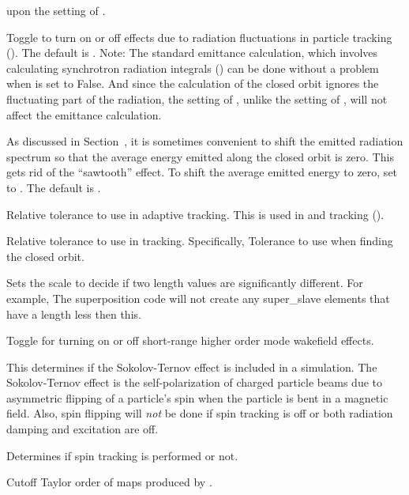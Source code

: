 {\begin{description}
upon the setting of .
%
\item[\vn{radiation_fluctuations_on}] \Newline
Toggle to turn on or off effects due to radiation fluctuations in particle tracking
().  The default is . Note: The standard \bmad emittance calculation,
which involves calculating synchrotron radiation integrals () can be done without
a problem when  is set to False. And since the calculation of the closed orbit
ignores the fluctuating part of the radiation, the setting of , unlike the
setting of , will not affect the emittance calculation.
%
\item[\vn{radiation_zero_average}] \Newline
As discussed in Section~, it is sometimes convenient to shift the emitted radiation
spectrum so that the average energy emitted along the closed orbit is zero. This gets rid of the ``sawtooth''
effect. To shift the average emitted energy to zero, set  to . The
default is .
%
\item[\vn{rel_tol_adaptive_tracking}] \Newline
Relative tolerance to use in adaptive tracking. This is used in  and
 tracking ().
%
\item[\vn{rel_tol_tracking}] \Newline
Relative tolerance to use in tracking. Specifically, Tolerance to use when finding the closed orbit.
%
\item[\vn{significant_length}] \Newline
Sets the scale to decide if two length values are significantly different. For example, The
superposition code will not create any super_slave elements that have a length less then this.
%
\item[\vn{sr_wakes_on}] \Newline
Toggle for turning on or off short-range higher order mode wakefield effects.
%
\item[\vn{spin_sokolov_ternov_flipping_on}] \Newline
This determines if the Sokolov-Ternov effect is included in a simulation.  The Sokolov-Ternov
effect\cite{b:barber99} is the self-polarization of charged particle beams due to asymmetric flipping
of a particle's spin when the particle is bent in a magnetic field. Also, spin flipping will {\em
not} be done if spin tracking is off or both radiation damping and excitation are off.
%
\item[\vn{spin_tracking_on}] \Newline
Determines if spin tracking is performed or not.
%
\item[\vn{taylor_order}] \Newline
Cutoff Taylor order of maps produced by .
\end{description}

}

